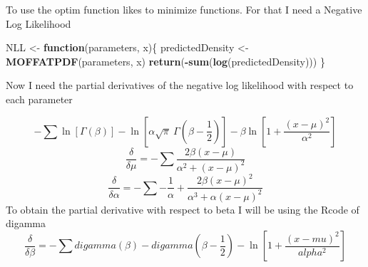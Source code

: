 \documentclass[
]{article}
\newenvironment{Shaded}{\begin{snugshade}}{\end{snugshade}}
\newcommand{\ControlFlowTok}[1]{\textcolor[rgb]{0.13,0.29,0.53}{\textbf{#1}}}
\newcommand{\FunctionTok}[1]{\textcolor[rgb]{0.13,0.29,0.53}{\textbf{#1}}}
\newcommand{\NormalTok}[1]{#1}
\newcommand{\OtherTok}[1]{\textcolor[rgb]{0.56,0.35,0.01}{#1}}
\newcommand{\SpecialCharTok}[1]{\textcolor[rgb]{0.81,0.36,0.00}{\textbf{#1}}}
\begin{document}
To use the optim function likes to minimize functions. For that I need a
Negative Log Likelihood

\begin{Shaded}
\begin{Highlighting}[]
\NormalTok{NLL }\OtherTok{\textless{}{-}} \ControlFlowTok{function}\NormalTok{(parameters, x)\{}
\NormalTok{  predictedDensity }\OtherTok{\textless{}{-}} \FunctionTok{MOFFATPDF}\NormalTok{(parameters, x)}
  \FunctionTok{return}\NormalTok{(}\SpecialCharTok{{-}}\FunctionTok{sum}\NormalTok{(}\FunctionTok{log}\NormalTok{(predictedDensity)))}
\NormalTok{\}}
\end{Highlighting}
\end{Shaded}

Now I need the partial derivatives of the negative log likelihood with
respect to each parameter

\[-\sum\ln\left[\Gamma(\beta)\right] - \ln\left[\alpha\sqrt\pi~\Gamma(\beta-\frac{1}{2})\right] - \beta\ln\left[1+\frac{(x-\mu)^2}{\alpha^2}\right]\]
\[\frac{\delta}{\delta\mu} = -\sum\frac{2\beta(x-\mu)}{\alpha^2 + (x-\mu)^2}\]
\[\frac{\delta}{\delta\alpha} = -\sum-\frac{1}{\alpha} + \frac{2\beta(x-\mu)^2}{\alpha^3 + \alpha(x-\mu)^2}\]
To obtain the partial derivative with respect to beta I will be using
the Rcode of digamma
\[\frac{\delta}{\delta\beta} = -\sum digamma(\beta) - digamma(\beta - \frac{1}{2}) - \ln\left[1+\frac{(x-mu)^2}{alpha^2}\right]\]
\end{document}
